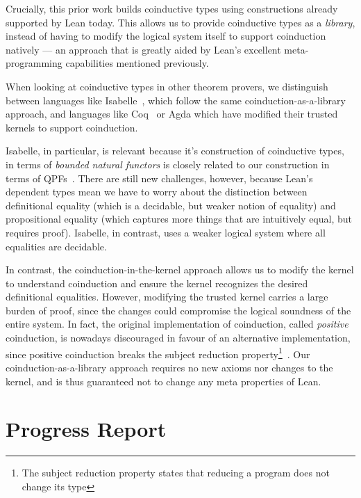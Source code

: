 \documentclass[a4paper]{scrartcl}
\begin{document}
Crucially, this prior work builds coinductive types using constructions
already supported by Lean today. This allows us to provide coinductive
types as a \emph{library}, instead of having to modify the logical
system itself to support coinduction natively --- an approach that is
greatly aided by Lean's excellent meta-programming capabilities
mentioned previously.

When looking at coinductive types in other theorem provers, we
distinguish between languages like Isabelle~\cite{traytelCategoryTheoryBased}, which follow the same
coinduction-as-a-library approach, and languages like Coq~\cite{gimenezTutorialRecursiveTypes1998,gimenezApplicationCoinductiveTypes1996}
or Agda which have modified their trusted kernels to support
coinduction.

Isabelle, in particular, is relevant because it's construction of
coinductive types, in terms of \emph{bounded natural functors} is
closely related to our construction in terms of QPFs~\cite{furerQuotientsBoundedNatural2022}. 
There are still new
challenges, however, because Lean's dependent types mean we have to
worry about the distinction between definitional equality (which is a
decidable, but weaker notion of equality) and propositional equality
(which captures more things that are intuitively equal, but requires
proof). Isabelle, in contrast, uses a weaker logical system where all
equalities are decidable.

In contrast, the coinduction-in-the-kernel approach allows us to modify
the kernel to understand coinduction and ensure the kernel recognizes
the desired definitional equalities. However, modifying the trusted
kernel carries a large burden of proof, since the changes could
compromise the logical soundness of the entire system. In fact, the
original implementation of coinduction, called \emph{positive}
coinduction, is nowadays discouraged in favour of an alternative
implementation, since positive coinduction breaks the subject reduction
property\footnote{The subject reduction property states that reducing a program does not change its type}~\cite{sozeauCorrectCompleteType}.
Our coinduction-as-a-library approach requires no new axioms nor
changes to the kernel, and is thus guaranteed not to change any meta
properties of Lean.


\section{Progress Report}\label{progress-report}
\end{document}
